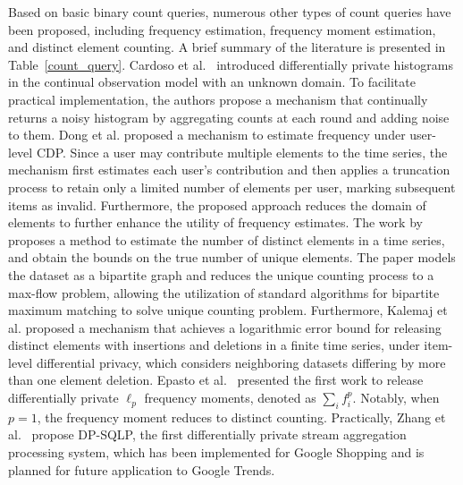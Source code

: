 Based on basic binary count queries, numerous other types of count queries have been proposed, including frequency estimation, frequency moment estimation, and distinct element counting. A brief summary of the literature is presented in Table~\ref{count_query}.
Cardoso et al.~\cite{cardoso2022differentially} introduced differentially private histograms in the continual observation model with an unknown domain. To facilitate practical implementation, the authors propose a mechanism that continually returns a noisy histogram by aggregating counts at each round and adding noise to them.
Dong et al. \cite{dong2023continual} proposed a mechanism to estimate frequency under user-level CDP. Since a user may contribute multiple elements to the time series, the mechanism first estimates each user's contribution and then applies a truncation process to retain only a limited number of elements per user, marking subsequent items as invalid. Furthermore, the proposed approach reduces the domain of elements to further enhance the utility of frequency estimates. 
The work by~\cite{knop2023counting} proposes a method to estimate the number of distinct elements in a time series, and obtain the bounds on the true number of unique elements. The paper models the dataset as a bipartite graph and reduces the unique counting process to a max-flow problem, allowing the utilization of standard algorithms for bipartite maximum matching to solve unique counting problem.
Furthermore, Kalemaj et al. \cite{kalemaj2023counting} proposed a mechanism that achieves a logarithmic error bound for releasing distinct elements with insertions and deletions in a finite time series, under item-level differential privacy, which considers neighboring datasets differing by more than one element deletion.
Epasto et al.~\cite{epasto2023differentially} presented the first work to release differentially private $\ell_p$ frequency moments, denoted as $\sum_i f_i^p$. Notably, when $p=1$, the frequency moment reduces to distinct counting.
Practically, Zhang et al.~\cite{zhang2023differentially} propose DP-SQLP, the first differentially private stream aggregation processing system, which has been implemented for Google Shopping and is planned for future application to Google Trends.





